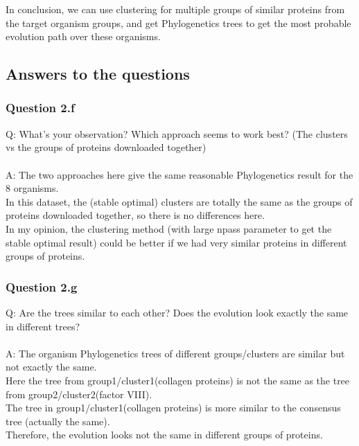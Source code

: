 \documentclass[a4paper, 12pt, one column]{article}
\begin{document}
In conclusion, we can use clustering  for multiple groups of similar proteins from the target organism groups, and get Phylogenetics trees to get the most probable evolution path over these organisms.

\subsection{Answers to the questions}
\subsubsection*{Question 2.f}
Q: What’s your observation? Which approach seems to work best? (The clusters vs the groups of proteins downloaded together)\\
\\
A: The two approaches here give the same reasonable Phylogenetics result for the 8 organisms. \\
In this dataset, the (stable optimal) clusters are totally the same as the groups of proteins downloaded together, so there is no differences here. \\
In my opinion, the clustering method (with large npass parameter to get the stable optimal result) could be better if we had very similar proteins in different groups of proteins.

\subsubsection*{Question 2.g}
Q: Are the trees similar to each other? Does the evolution look exactly the same in different
trees? \\
\\
A: The organism Phylogenetics trees of different groups/clusters are similar but not exactly the same. \\
Here the tree from group1/cluster1(collagen proteins) is not the same as the tree from group2/cluster2(factor VIII). \\
The tree in group1/cluster1(collagen proteins) is more similar to the consensus tree (actually the same). \\
Therefore, the evolution looks not the same in different groups of proteins.
\end{document}
